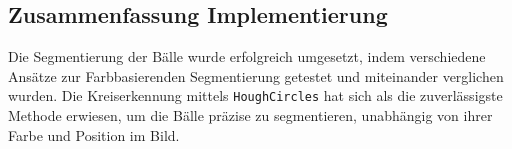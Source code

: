 \begin{minipage}[t]{0.3\textwidth}
\end{minipage}
%
\begin{minipage}[t]{0.3\textwidth}
\end{minipage}
%
\begin{minipage}[t]{0.3\textwidth}
\end{minipage}

\subsection{Zusammenfassung Implementierung}

Die Segmentierung der Bälle wurde erfolgreich umgesetzt, indem verschiedene Ansätze zur Farbbasierenden Segmentierung getestet und miteinander verglichen wurden. Die Kreiserkennung mittels \texttt{HoughCircles} hat sich als die zuverlässigste Methode erwiesen, um die Bälle präzise zu segmentieren, unabhängig von ihrer Farbe und Position im Bild.
